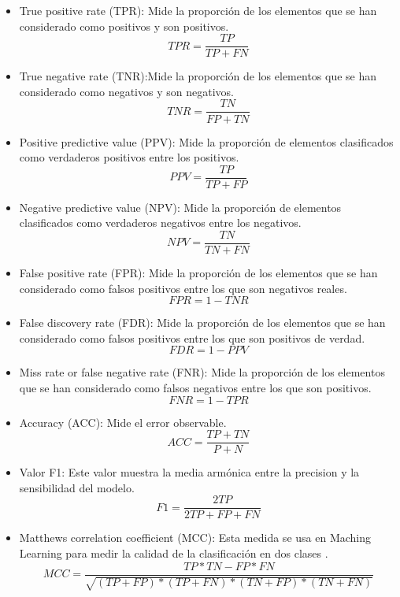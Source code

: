 \begin{itemize}
\item True positive rate (TPR): Mide la proporción de los elementos que se han considerado como positivos y son positivos.
\[\mathit{TPR}=\frac{\mathit{TP}}{\mathit{TP}+\mathit{FN}}\]

\item True negative rate (TNR):Mide la proporción de los elementos que se han considerado como negativos y son negativos. 
\[\mathit{TNR}=\frac{\mathit{TN}}{\mathit{FP}+\mathit{TN}}\]

\item Positive predictive value (PPV): Mide la proporción de elementos clasificados como verdaderos positivos entre los positivos.
\[\mathit{PPV}=\frac{\mathit{TP}}{\mathit{TP}+\mathit{FP}}\]


\item Negative predictive value (NPV): Mide la proporción de elementos clasificados como verdaderos negativos entre los negativos.  
\[\mathit{NPV}=\frac{\mathit{TN}}{\mathit{TN}+\mathit{FN}}\]


\item False positive rate (FPR):
Mide la proporción de los elementos que se han considerado como falsos positivos entre los que son negativos reales.
 \[\mathit{FPR}=1-\mathit{TNR}\]

\item False discovery rate (FDR):
Mide la proporción de los elementos que se han considerado como falsos positivos entre los que son positivos de verdad.
\[\mathit{FDR}=1-\mathit{PPV}\]

\item Miss rate or false negative rate (FNR):
Mide la proporción de los elementos que se han considerado como falsos negativos entre los que son  positivos.
\[\mathit{FNR}=1-\mathit{TPR}\]

\item Accuracy (ACC): Mide el error observable.
\[\mathit{\mathit{ACC}}=\frac{\mathit{TP}+\mathit{TN}}{P+N}\]

\item Valor F1: Este valor muestra la media armónica entre la precision y la sensibilidad del modelo.
\[\mathit{F1}=\frac{2\mathit{TP}}{2\mathit{TP}+\mathit{FP}+\mathit{FN}}\]

\item Matthews correlation coefficient (MCC):
Esta medida se usa en Maching Learning para medir la calidad de la clasificación en dos clases \cite{wiki:machineMCC}.
 \[\mathit{MCC}=\frac{\mathit{TP}*\mathit{TN}-\mathit{FP}*\mathit{FN}}{\sqrt{(\mathit{TP}+\mathit{FP})*(\mathit{TP}+\mathit{FN})*(\mathit{TN}+\mathit{FP})*(\mathit{TN}+\mathit{FN})}}\]
 

\end{itemize}
